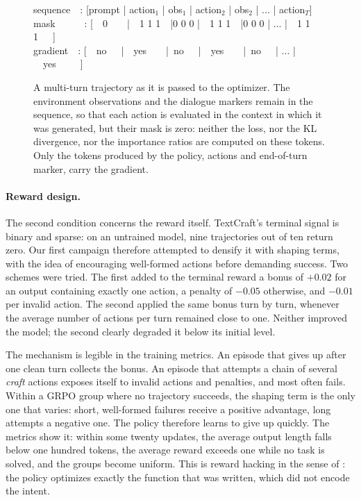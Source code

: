 \documentclass[11pt,a4paper]{article}
\begin{document}
\begin{figure}[htbp]
\centering
\begin{tcolorbox}[colback=gray!4, colframe=black!65, width=0.96\textwidth,
    title=\textbf{Training sequence of an episode and observation mask},
    fonttitle=\small, boxrule=0.6pt, arc=2mm, left=3mm, right=3mm, top=2mm, bottom=2mm]
{\small\ttfamily
sequence\ \ : [prompt | action$_1$ | obs$_1$ | action$_2$ | obs$_2$ | ... | action$_T$]\\
mask\ \ \ \ \ \ : [\ \ 0\ \ \ \ |\ \ 1 1 1\ \  |0 0 0 |\ \ 1 1 1\ \ |0 0 0 | ... |\ \ 1 1 1\ \ \ ]\\
gradient\  \ : [\ \ no\ \ \ |\ \ yes\ \ \ \  |\ no\ \ \ |\ \ yes\ \  \ \ |\ no\ \ \ | ... |\ \ yes\ \ \ \ \ ]
}
\end{tcolorbox}
\caption{A multi-turn trajectory as it is passed to the optimizer. The environment observations and the dialogue markers remain in the sequence, so that each action is evaluated in the context in which it was generated, but their mask is zero: neither the loss, nor the KL divergence, nor the importance ratios are computed on these tokens. Only the tokens produced by the policy, actions and end-of-turn marker, carry the gradient.}
\label{fig:env_mask}
\end{figure}





\paragraph{Reward design.} The second condition concerns the reward itself. TextCraft's terminal signal is binary and sparse: on an untrained model, nine trajectories out of ten return zero. Our first campaign therefore attempted to densify it with shaping terms, with the idea of encouraging well-formed actions before demanding success. Two schemes were tried. The first added to the terminal reward a bonus of $+0.02$ for an output containing exactly one action, a penalty of $-0.05$ otherwise, and $-0.01$ per invalid action. The second applied the same bonus turn by turn, whenever the average number of actions per turn remained close to one. Neither improved the model; the second clearly degraded it below its initial level.

The mechanism is legible in the training metrics. An episode that gives up after one clean turn collects the bonus. An episode that attempts a chain of several \emph{craft} actions exposes itself to invalid actions and penalties, and most often fails. Within a GRPO group where no trajectory succeeds, the shaping term is the only one that varies: short, well-formed failures receive a positive advantage, long attempts a negative one. The policy therefore learns to give up quickly. The metrics show it: within some twenty updates, the average output length falls below one hundred tokens, the average reward exceeds one while no task is solved, and the groups become uniform. This is reward hacking in the sense of \cite{skalse2022defining}: the policy optimizes exactly the function that was written, which did not encode the intent.
\end{document}

